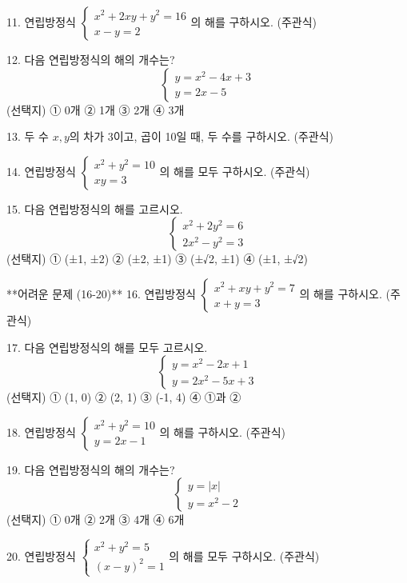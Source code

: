 \documentclass[fleqn]{article}
\begin{document}
11. 연립방정식 \(\begin{cases} x^2 + 2xy + y^2 = 16 \\ x - y = 2 \end{cases}\)의 해를 구하시오. (주관식)  

12. 다음 연립방정식의 해의 개수는?  
    \[
    \begin{cases} 
    y = x^2 - 4x + 3 \\ 
    y = 2x - 5 
    \end{cases}
    \]  
    (선택지) ① 0개 ② 1개 ③ 2개 ④ 3개  

13. 두 수 \(x, y\)의 차가 3이고, 곱이 10일 때, 두 수를 구하시오. (주관식)  

14. 연립방정식 \(\begin{cases} x^2 + y^2 = 10 \\ xy = 3 \end{cases}\)의 해를 모두 구하시오. (주관식)  

15. 다음 연립방정식의 해를 고르시오.  
    \[
    \begin{cases} 
    x^2 + 2y^2 = 6 \\ 
    2x^2 - y^2 = 3 
    \end{cases}
    \]  
    (선택지) ① (±1, ±2) ② (±2, ±1) ③ (±√2, ±1) ④ (±1, ±√2)  

**어려운 문제 (16-20)**  
16. 연립방정식 \(\begin{cases} x^2 + xy + y^2 = 7 \\ x + y = 3 \end{cases}\)의 해를 구하시오. (주관식)  

17. 다음 연립방정식의 해를 모두 고르시오.  
    \[
    \begin{cases} 
    y = x^2 - 2x + 1 \\ 
    y = 2x^2 - 5x + 3 
    \end{cases}
    \]  
    (선택지) ① (1, 0) ② (2, 1) ③ (-1, 4) ④ ①과 ②  

18. 연립방정식 \(\begin{cases} x^2 + y^2 = 10 \\ y = 2x - 1 \end{cases}\)의 해를 구하시오. (주관식)  

19. 다음 연립방정식의 해의 개수는?  
    \[
    \begin{cases} 
    y = |x| \\ 
    y = x^2 - 2 
    \end{cases}
    \]  
    (선택지) ① 0개 ② 2개 ③ 4개 ④ 6개  

20. 연립방정식 \(\begin{cases} x^2 + y^2 = 5 \\ (x - y)^2 = 1 \end{cases}\)의 해를 모두 구하시오. (주관식)  

      
    
\end{document}
